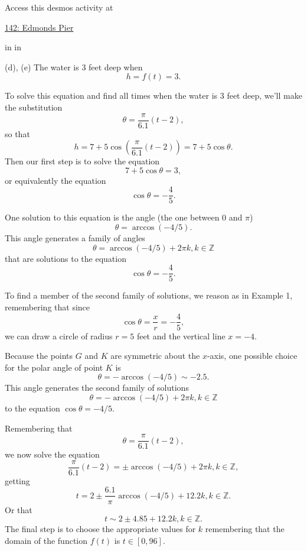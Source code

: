 \documentclass{ximera}
\newcommand{\pskip}{\vskip 0.1 in}
\begin{document}
\begin{example}
\begin{explanation}
 
\begin{onlineOnly}
    \begin{center}
\end{center}
\end{onlineOnly}
  
Access this desmos activity at
 
\href{https://www.desmos.com/calculator/3w56sayz2h}{142: Edmonds Pier}


\pskip \pskip

(d), (e) The water is $3$ feet deep when
\[
   h = f(t) =3.
\]

To solve this equation and find all times when the water is $3$ feet deep, we'll make the substitution
\[
    \theta = \frac{\pi}{6.1}(t-2) ,
\]
so that
\[
     h = 7 + 5 \cos \left( \frac{\pi}{6.1}(t-2)  \right) = 7 + 5\cos\theta.
\]  
Then our first step is to solve the equation 
\[
  7 + 5\cos\theta = 3 ,
\]
or equivalently the equation
\[
   \cos \theta = -\frac{4}{5} .
\]

One solution to this equation is the angle (the one between $0$ and $\pi$)
\[
   \theta = \arccos(-4/5) .
\]
This angle generates a family of angles
\[
    \theta = \arccos(-4/5)  + 2\pi k, k\in \mathbb{Z}
\]
that are solutions to the equation 
\[
   \cos\theta = -\frac{4}{5} .
\]

To find a member of the second family of solutions, we reason as in Example 1, remembering that since
\[
\cos\theta = \frac{x}{r}   = -\frac{4}{5} ,
\] 
we can draw a circle of radius $r=5$ feet and the vertical line $x=-4$. 

\begin{onlineOnly}
    \begin{center}
\end{center}
\end{onlineOnly}

Because the points $G$ and $K$ are symmetric about the $x$-axis, one possible choice for the polar angle of point $K$ is
\[
   \theta=  - \arccos(-4/5) \sim -2.5 .
\]
This angle generates the second family of solutions
\[
  \theta = -\arccos(-4/5)  + 2\pi k, k\in \mathbb{Z}
\]
to the equation $\cos\theta = -4/5$.

Remembering that
\[
  \theta =  \frac{\pi}{6.1}(t-2) ,
\]
we now solve the equation
\[
     \frac{\pi}{6.1}(t-2) = \pm \arccos(-4/5)  + 2\pi k , k\in \mathbb{Z},
\]
getting
\[
   t = 2 \pm \frac{6.1}{\pi} \arccos(-4/5) + 12.2 k , k\in \mathbb{Z}.
\]
Or that
\[
      t  \sim 2 \pm 4.85 + 12.2 k , k\in \mathbb{Z}.
\]
The final step is to choose the appropriate values for $k$ remembering that the domain of the function $f(t)$ is $t\in [0,96]$.


\end{explanation}

\end{example}
\end{document}

